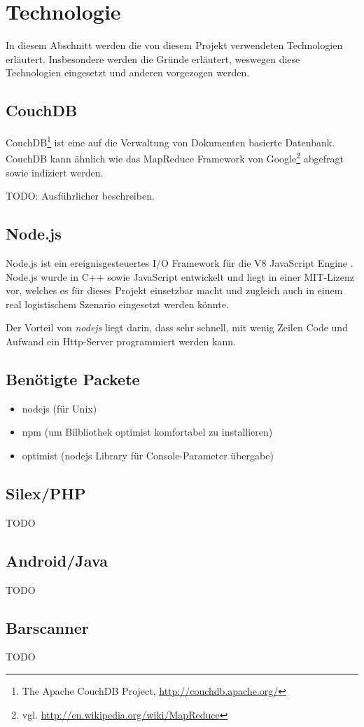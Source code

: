 \section{Technologie}
\label{sec:technology}

In diesem Abschnitt werden die von diesem Projekt verwendeten Technologien erläutert. Insbesondere werden die Gründe erläutert, weswegen diese Technologien eingesetzt und anderen vorgezogen werden.

\subsection{CouchDB}
\label{subsec:couchdb}
CouchDB\footnote{The Apache CouchDB Project, \url{http://couchdb.apache.org/}} ist eine auf die Verwaltung von Dokumenten basierte Datenbank. CouchDB kann ähnlich wie das MapReduce Framework von Google\footnote{vgl. \url{http://en.wikipedia.org/wiki/MapReduce}} abgefragt sowie indiziert werden.

TODO: Ausführlicher beschreiben.

\subsection{Node.js}
\label{subsec:nodejs}

Node.js ist ein ereignisgesteuertes I/O Framework für die V8 JavaScript Engine \cite{Wikipedia10a}. Node.js wurde in C++ sowie JavaScript entwickelt und liegt in einer MIT-Lizenz vor, welches es für dieses Projekt einsetzbar macht und zugleich auch in einem real logistischem Szenario eingesetzt werden könnte.

Der Vorteil von \textit{nodejs} liegt darin, dass sehr schnell, mit wenig
Zeilen Code und Aufwand ein Http-Server programmiert werden kann.

\subsection{Benötigte Packete}
\begin{itemize}
  \item nodejs (für Unix)
  \item npm (um Bilbliothek optimist komfortabel zu installieren)
  \item optimist (nodejs Library für Console-Parameter übergabe)
\end{itemize}


\subsection{Silex/PHP}

TODO

\subsection{Android/Java}

TODO

\subsection{Barscanner}

TODO